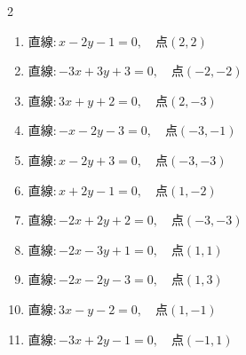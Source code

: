 \begin{multicols}{2}
\begin{enumerate}

  \item $直線:x-2y-1=0,\quad 点 ( 2, 2 )$


  \item $直線:-3x+3y+3=0,\quad 点 ( -2, -2 )$


  \item $直線:3x+y+2=0,\quad 点 ( 2, -3 )$


  \item $直線:-x-2y-3=0,\quad 点 ( -3, -1 )$


\columnbreak %

\resetques

  \item $直線:x-2y+3=0,\quad 点 ( -3, -3 )$


  \item $直線:x+2y-1=0,\quad 点 ( 1, -2 )$


  \item $直線:-2x+2y+2=0,\quad 点 ( -3, -3 )$


  \item $直線:-2x-3y+1=0,\quad 点 ( 1, 1 )$


  \item $直線:-2x-2y-3=0,\quad 点 ( 1, 3 )$


  \item $直線:3x-y-2=0,\quad 点 ( 1, -1 )$


  \item $直線:-3x+2y-1=0,\quad 点 ( -1, 1 )$


\end{enumerate}
\end{multicols}
